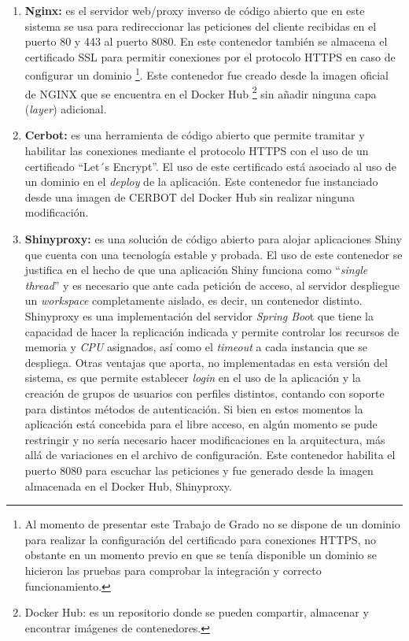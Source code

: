 \documentclass[
  12pt,
  openany]{book}
\begin{document}
\begin{enumerate}
\def\labelenumi{\arabic{enumi}.}
\item
  \textbf{Nginx:} es el servidor web/proxy inverso de código abierto que en este sistema se usa para redireccionar las peticiones del cliente recibidas en el puerto 80 y 443 al puerto 8080. En este contenedor también se almacena el certificado SSL para permitir conexiones por el protocolo HTTPS en caso de configurar un dominio \footnote{Al momento de presentar este Trabajo de Grado no se dispone de un dominio para realizar la configuración del certificado para conexiones HTTPS, no obstante en un momento previo en que se tenía disponible un dominio se hicieron las pruebas para comprobar la integración y correcto funcionamiento.}. Este contenedor fue creado desde la imagen oficial de NGINX que se encuentra en el Docker Hub \footnote{Docker Hub: es un repositorio donde se pueden compartir, almacenar y encontrar imágenes de contenedores.} sin añadir ninguna capa (\emph{layer}) adicional.
\item
  \textbf{Cerbot:} es una herramienta de código abierto que permite tramitar y habilitar las conexiones mediante el protocolo HTTPS con el uso de un certificado ``Let´s Encrypt''. El uso de este certificado está asociado al uso de un dominio en el \emph{deploy} de la aplicación. Este contenedor fue instanciado desde una imagen de CERBOT del Docker Hub sin realizar ninguna modificación.
\item
  \textbf{Shinyproxy:} es una solución de código abierto para alojar aplicaciones Shiny \citep{shinyproxy2023} que cuenta con una tecnología estable y probada. El uso de este contenedor se justifica en el hecho de que una aplicación Shiny funciona como ``\emph{single thread}'' y es necesario que ante cada petición de acceso, al servidor despliegue un \emph{workspace} completamente aislado, es decir, un contenedor distinto. Shinyproxy es una implementación del servidor \emph{Spring Boo}t que tiene la capacidad de hacer la replicación indicada y permite controlar los recursos de memoria y \emph{CPU} asignados, así como el \emph{timeout} a cada instancia que se despliega. Otras ventajas que aporta, no implementadas en esta versión del sistema, es que permite establecer \emph{login} en el uso de la aplicación y la creación de grupos de usuarios con perfiles distintos, contando con soporte para distintos métodos de autenticación. Si bien en estos momentos la aplicación está concebida para el libre acceso, en algún momento se pude restringir y no sería necesario hacer modificaciones en la arquitectura, más allá de variaciones en el archivo de configuración. Este contenedor habilita el puerto 8080 para escuchar las peticiones y fue generado desde la imagen almacenada en el Docker Hub, Shinyproxy.

\end{enumerate}
\end{document}
